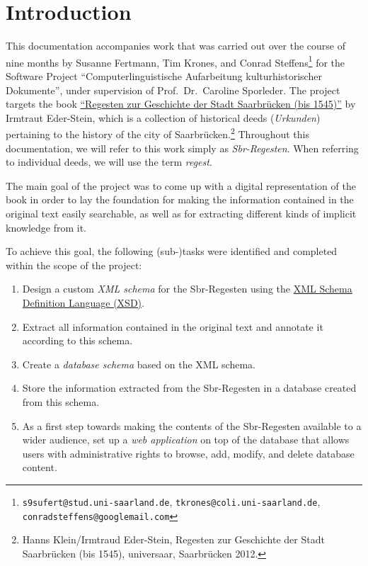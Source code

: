 \section{Introduction}
\label{sec:intro}

This documentation accompanies work that was carried out over the
course of nine months by Susanne Fertmann, Tim Krones, and Conrad
Steffens\footnote{\texttt{s9sufert@stud.uni-saarland.de},
  \texttt{tkrones@coli.uni-saarland.de},
  \texttt{conradsteffens@googlemail.com}} for the Software Project
``Computerlinguistische Aufarbeitung kulturhistorischer Dokumente'',
under supervision of Prof.~Dr.~Caroline Sporleder. The project targets
the book
\href{http://universaar.uni-saarland.de/monographien/volltexte/2012/82/pdf/regesten.pdf}{``Regesten
  zur Geschichte der Stadt Saarbrücken (bis 1545)''} by Irmtraut
Eder-Stein, which is a collection of historical deeds
(\emph{Urkunden}) pertaining to the history of the city of
Saarbrücken.\footnote{Hanns Klein/Irmtraud Eder-Stein, Regesten zur
  Geschichte der Stadt Saarbrücken (bis 1545), universaar, Saarbrücken
  2012.} Throughout this documentation, we will refer to this work
simply as \emph{Sbr-Regesten}. When referring to individual deeds, we
will use the term \emph{regest}.

The main goal of the project was to come up with a digital
representation of the book in order to lay the foundation for making
the information contained in the original text easily searchable, as
well as for extracting different kinds of implicit knowledge from it.

To achieve this goal, the following (sub-)tasks were identified and
completed within the scope of the project:

\begin{enumerate}
\item Design a custom \emph{XML schema} for the Sbr-Regesten using the
  \href{https://en.wikipedia.org/wiki/XML_Schema_(W3C)}{XML Schema
    Definition Language (XSD)}.
\item Extract all information contained in the original text and
  annotate it according to this schema.
\item Create a \emph{database schema} based on the XML schema.
\item Store the information extracted from the Sbr-Regesten in a
  database created from this schema.
\item As a first step towards making the contents of the Sbr-Regesten
  available to a wider audience, set up a \emph{web application} on
  top of the database that allows users with administrative rights to
  browse, add, modify, and delete database content.
\end{enumerate}

